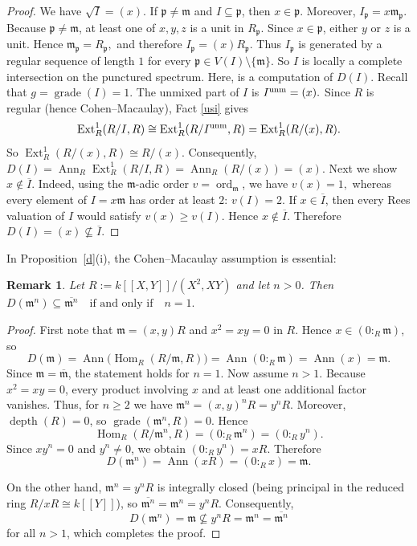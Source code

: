 \documentclass[11pt,a4paper]{amsart}
\numberwithin{equation}{section}
\newtheorem{remark}[theorem]{Remark}
\DeclareMathOperator{\grade}{grade}
\DeclareMathOperator{\Ann}{Ann}\DeclareMathOperator{\ann}{Ann}
\DeclareMathOperator{\Hom}{Hom}
\DeclareMathOperator{\depth}{depth}
\newcommand{\fm}{\mathfrak{m}}
\begin{document}
\begin{proof}
We have
$
	\sqrt{I} = (x).
$
	If \(\mathfrak p \neq \mathfrak m\) and \(I \subseteq \mathfrak p\), then \(x \in \mathfrak p\). Moreover,
$
	I_{\mathfrak p} = x\mathfrak m_{\mathfrak p}.
$
	Because \(\mathfrak p \neq \mathfrak m\), at least one of \(x, y, z\) is a unit in \(R_{\mathfrak p}\). Since \(x \in \mathfrak p\), either \(y\) or \(z\) is a unit. Hence
$
	\mathfrak m_{\mathfrak p} = R_{\mathfrak p},
$
	and therefore
$
	I_{\mathfrak p} = (x)R_{\mathfrak p}.
$
	Thus \(I_{\mathfrak p}\) is generated by a regular sequence of length \(1\) for every
$
	\mathfrak p \in V(I) \setminus \{\mathfrak m\}.
$
	So \(I\) is locally a complete intersection on the punctured spectrum.
Here, is a computation of \(D(I)\). 
Recall that
$	g = \operatorname{grade}(I) = 1.
$
	The unmixed part of \(I\) is
$
	I^{\rm unm} = (x).
$
	Since \(R\) is regular (hence Cohen--Macaulay), Fact \ref{usi}  gives
	\[
	\operatorname{Ext}^1_R(R/I, R) \cong \operatorname{Ext}^1_R(R/I^{\rm unm}, R)
	= \operatorname{Ext}^1_R(R/(x), R).
	\]
So
$
	\operatorname{Ext}^1_R(R/(x), R) \cong R/(x).
$
	Consequently,
	$
	D(I) = \operatorname{Ann}_R \operatorname{Ext}^1_R(R/I, R)
	= \operatorname{Ann}_R(R/(x))
	= (x).
$
Next we show \(x \notin \overline{I}\).
Indeed, using the \(\mathfrak m\)-adic order \(v = \operatorname{ord}_{\mathfrak m}\), we have
	\(
	v(x) = 1,
	\)
	whereas every element of \(I = x\mathfrak m\) has order at least \(2\):
	\(
	v(I) = 2.
	\)
	If \(x \in \overline{I}\), then every Rees valuation of \(I\) would satisfy
	\(
	v(x) \ge v(I).
	\) Hence
	\(
	x \notin \overline{I}.
	\)
	Therefore
$D(I) = (x) \nsubseteq \overline{I}$.
\end{proof}
In Proposition~\ref{d}(i), the Cohen--Macaulay assumption is essential:

\begin{remark}
	Let $R:=k[[X,Y]]/(X^2,XY)$ and let $n>0$. Then 
	\(
	D(\fm^n) \subseteq \overline{\fm^n}
	\quad\text{if and only if}\quad n=1.
	\)
\end{remark}

\begin{proof}
	First note that $\fm=(x,y)R$ and $x^2=xy=0$ in $R$. Hence $x\in (0:_R\fm)$, so
	\[
	D(\fm)=\Ann\!\big(\Hom_R(R/\fm,R)\big)=\Ann(0:_R\fm)=\Ann(x)=\fm.
	\]
	Since $\fm=\overline{\fm}$, the statement holds for $n=1$.
	Now assume $n>1$. Because $x^2=xy=0$, every product involving $x$ and at least one additional factor vanishes. Thus, for $n\ge 2$ we have
	\(
	\fm^n=(x,y)^nR=y^nR.
	\)
	Moreover, $\depth(R)=0$, so $\grade(\fm^n,R)=0$. Hence
	\[
	\Hom_R(R/\fm^n,R)=(0:_R \fm^n)=(0:_R y^n).
	\]
	Since $xy^n=0$ and $y^n\neq 0$, we obtain $(0:_R y^n)=xR$. Therefore
	\[
	D(\fm^n)=\Ann(xR)=(0:_R x)=\fm.
	\]
	
	On the other hand, $\fm^n=y^nR$ is integrally closed (being principal in the reduced ring $R/xR\cong k[[Y]]$), so
	\(
	\overline{\fm^n}=\fm^n=y^nR.
	\)
	Consequently,
	\[
	D(\fm^n)=\fm \nsubseteq y^nR=\fm^n=\overline{\fm^n}
	\]
	for all $n>1$, which completes the proof.
\end{proof}
\end{document}
